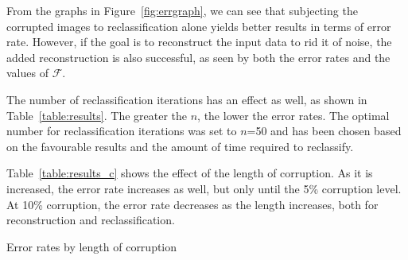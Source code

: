 \documentclass{report}
\begin{document}
From the graphs in Figure~\ref{fig:errgraph}, we can see that subjecting the corrupted images to reclassification alone yields better results in terms of error rate. However, if the goal is to reconstruct the input data to rid it of noise, the added reconstruction is also successful, as seen by both the error rates and the values of $\mathcal{F}$. 

The number of reclassification iterations has an effect as well, as shown in Table~\ref{table:results}. The greater the $n$, the lower the error rates. The optimal number for reclassification iterations was set to $n$=50 and has been chosen based on the favourable results and the amount of time required to reclassify.

Table~\ref{table:results_c} shows the effect of the length of corruption. As it is increased, the error rate increases as well, but only until the 5\% corruption level. At 10\% corruption, the error rate decreases as the length increases, both for reconstruction and reclassification.




\begin{table}
	\begin{footnotesize}
	\end{footnotesize}
	\caption{Error rates by length of corruption}
	\label{table:results_c}
\end{table}
\end{document}
